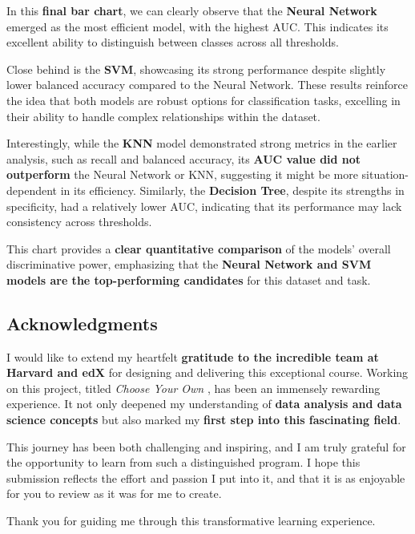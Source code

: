 \documentclass[
]{article}
\begin{document}
In this \textbf{final bar chart}, we can clearly observe that the
\textbf{Neural Network} emerged as the most efficient model, with the
highest AUC. This indicates its excellent ability to distinguish between
classes across all thresholds.

Close behind is the \textbf{SVM}, showcasing its strong performance
despite slightly lower balanced accuracy compared to the Neural Network.
These results reinforce the idea that both models are robust options for
classification tasks, excelling in their ability to handle complex
relationships within the dataset.

Interestingly, while the \textbf{KNN} model demonstrated strong metrics
in the earlier analysis, such as recall and balanced accuracy, its
\textbf{AUC value did not outperform} the Neural Network or KNN,
suggesting it might be more situation-dependent in its efficiency.
Similarly, the \textbf{Decision Tree}, despite its strengths in
specificity, had a relatively lower AUC, indicating that its performance
may lack consistency across thresholds.

This chart provides a \textbf{clear quantitative comparison} of the
models' overall discriminative power, emphasizing that the
\textbf{Neural Network and SVM models are the top-performing candidates}
for this dataset and task.

\newpage

\subsection{Acknowledgments}\label{acknowledgments}

I would like to extend my heartfelt \textbf{gratitude to the incredible
team at Harvard and edX} for designing and delivering this exceptional
course. Working on this project, titled \emph{Choose Your Own} , has
been an immensely rewarding experience. It not only deepened my
understanding of \textbf{data analysis and data science concepts} but
also marked my \textbf{first step into this fascinating field}.

This journey has been both challenging and inspiring, and I am truly
grateful for the opportunity to learn from such a distinguished program.
I hope this submission reflects the effort and passion I put into it,
and that it is as enjoyable for you to review as it was for me to
create.

Thank you for guiding me through this transformative learning
experience.
\end{document}
